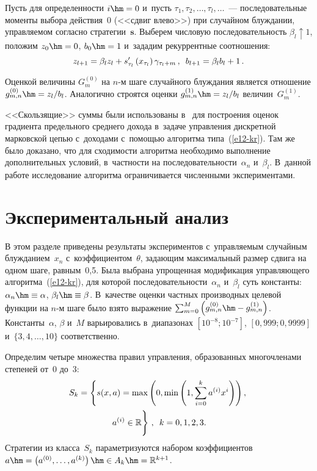 \begin{multicols}{2}
  Пусть для определенности $i\hm=0$ и~пусть $\tau_1, \tau_2, \ldots ,  
\tau_l,\ldots$~--- последовательные моменты выбора действия~0 (<<сдвиг влево>>) 
при случайном блуж\-да\-нии, управ\-ля\-емом согласно стратегии~$\mathbf{s}$. Выберем 
чис\-ло\-вую последовательность $\beta_l\uparrow 1$, положим $z_0\hm=0$, 
$b_0\hm=1$ и~зададим рекуррентные соотношения:
  $$
  z_{l+1}=\beta_l z_l +s^\prime_{\tau_l} \left( x_{\tau_l}\right) 
\gamma_{\tau_l+m}\,,\enskip
  b_{l+1}=\beta_l b_l+1\,.
  $$
  
  Оценкой величины $G_m^{(0)}$ на $n$-м шаге случайного блуж\-да\-ния 
является отношение $g_{m,n}^{(0)}\hm= z_l/b_l$. Аналогично строятся 
оценки $g_{m,n}^{(1)}\hm= z_l/b_l$ величин~$G_m^{(1)}$.
  
  <<Скользящие>> суммы были использованы в~\cite{15-kr} для построения 
оценок градиента предельного среднего дохода в~задаче управ\-ле\-ния 
дискретной марковской цепью с~доходами с~по\-мощью алгоритма 
типа~(\ref{e12-kr}). Там же было доказано, что для схо\-ди\-мости алгоритма 
необходимо выполнение дополнительных условий, в~част\-ности на 
последовательности~$\alpha_n$ и~$\beta_l$. В~данной работе исследование 
алгоритма ограничивается численными экспериментами.
  
  \section{Экспериментальный анализ}
  
  В этом разделе приведены результаты экспериментов с~управляемым 
случайным блужданием~$x_n$ с~коэффициентом~$\theta$, задающим 
максимальный размер сдвига на одном шаге, равным~0,5. Была выбрана 
упрощенная модификация управ\-ля\-юще\-го алгоритма~(\ref{e12-kr}), для 
которой последовательности~$\alpha_n$ и~$\beta_l$ суть константы: 
$\alpha_n\hm\equiv \alpha$, $\beta_l\hm\equiv \beta$. В~качестве оценки 
част\-ных производных целевой функции на $n$-м шаге было взято выражение 
$\sum\nolimits_{m=0}^M \left( g_{m,n}^{(0)} \hm- g_{m,n}^{(1)}\right)$. 
Константы~$\alpha$, $\beta$ и~$M$ варьировались в~диапазонах $[10^{-8}; 
10^{-7}]$, $[0{,}999; 0{,}9999]$ и~$\{3,4,\ldots , 10\}$ соответственно.
  
  Определим четыре множества правил управ\-ле\-ния, образованных 
многочленами степеней от~0 до~3:
  \begin{multline*}
  S_k=\left\{ s(x,a) =\max \left( 0,\min\left(1, \sum\limits^k_{i=0} a^{(i)} 
x^i\right)\right), \right.\\ \left.a^{(i)}\in \mathbb{R}
\vphantom{\left( 0,\min\left(1, \sum\limits^k_{i=0} a^{(i)} 
x^i\right)\right)}
\right\}\,,\enskip
  k=0,1,2,3.
  \end{multline*}
Стратегии из класса~$S_k$ па\-ра\-мет\-ри\-зу\-ют\-ся набором коэффициентов 
$a\hm= \left( a^{(0)}, \ldots , a^{(k)}\right)\hm\in A_k \hm= \mathbb{R}^{k+1}$.


\end{multicols}
